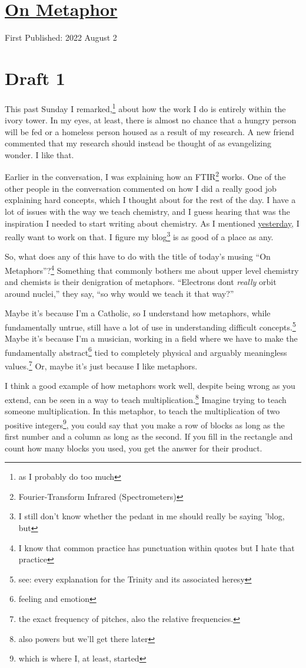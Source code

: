 \documentclass[12pt]{article}[titlepage]
\newcommand{\say}[1]{``#1''}
\newcommand{\1}{\={a}}
\newcommand{\2}{\={e}}
\newcommand{\3}{\={\i}}
\newcommand{\4}{\=o}
\newcommand{\5}{\=u}
\newcommand{\6}{\={A}}
\renewcommand{\,}{\textsuperscript{,}}
\begin{document}
\doublespacing
\section{\href{metaphor.html}{On Metaphor}}
First Published: 2022 August 2
\section{Draft 1}
This past Sunday I remarked,\footnote{as I probably do too much} about how the work I do is entirely within the ivory tower.
In my eyes, at least, there is almost no chance that a hungry person will be fed or a homeless person housed as a result of my research.
A new friend commented that my research should instead be thought of as evangelizing wonder.
I like that.

Earlier in the conversation, I was explaining how an FTIR\footnote{Fourier-Transform Infrared (Spectrometers)} works.
One of the other people in the conversation commented on how I did a really good job explaining hard concepts, which I thought about for the rest of the day.
I have a lot of issues with the way we teach chemistry, and I guess hearing that was the inspiration I needed to start writing about chemistry.
As I mentioned \href{reflection-july-2022.html}{yesterday}, I really want to work on that.
I figure my blog\footnote{I still don't know whether the pedant in me should really be saying 'blog, but} is as good of a place as any.

So, what does any of this have to do with the title of today's musing \say{On Metaphors}?\footnote{I know that common practice has punctuation within quotes but I hate that practice}
Something that commonly bothers me about upper level chemistry and chemists is their denigration of metaphors.
\say{Electrons dont \emph{really} orbit around nuclei,} they say, \say{so why would we teach it that way?}

Maybe it's because I'm a Catholic, so I understand how metaphors, while fundamentally untrue, still have a lot of use in understanding difficult concepts.\footnote{see: every explanation for the Trinity and its associated heresy}
Maybe it's because I'm a musician, working in a field where we have to make the fundamentally abstract\footnote{feeling and emotion} tied to completely physical and arguably meaningless values.\footnote{the exact frequency of pitches, also the relative frequencies.}
Or, maybe it's just because I like metaphors.

I think a good example of how metaphors work well, despite being wrong as you extend, can be seen in a way to teach multiplication.\footnote{also powers but we'll get there later}
Imagine trying to teach someone multiplication.
In this metaphor, to teach the multiplication of two positive integers\footnote{which is where I, at least, started}, you could say that you make a row of blocks as long as the first number and a column as long as the second.
If you fill in the rectangle and count how many blocks you used, you get the answer for their product.
\end{document}
